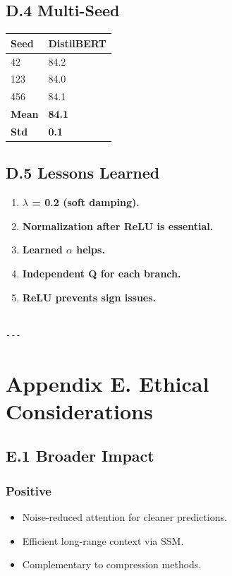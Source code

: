 \subsection{D.4 Multi-Seed}

\begin{table}[H]
\centering
\small
\begin{tabular}{ll}
\toprule
\textbf{Seed} & \textbf{DistilBERT} \\
\midrule
42 & 84.2 \\
123 & 84.0 \\
456 & 84.1 \\
\textbf{Mean} & \textbf{84.1} \\
\textbf{Std} & \textbf{0.1} \\
\bottomrule
\end{tabular}
\end{table}

\subsection{D.5 Lessons Learned}

\begin{enumerate}
\item \textbf{$\lambda$ = 0.2 (soft damping).}
\item \textbf{Normalization after ReLU is essential.}
\item \textbf{Learned $\alpha$ helps.}
\item \textbf{Independent Q for each branch.}
\item \textbf{ReLU prevents sign issues.}
\end{enumerate}
\begin{lstlisting}

---
\end{lstlisting}

\section{Appendix E. Ethical Considerations}

\subsection{E.1 Broader Impact}

\subsubsection{Positive}
\begin{itemize}
\item Noise-reduced attention for cleaner predictions.
\item Efficient long-range context via SSM.
\item Complementary to compression methods.

\end{itemize}
